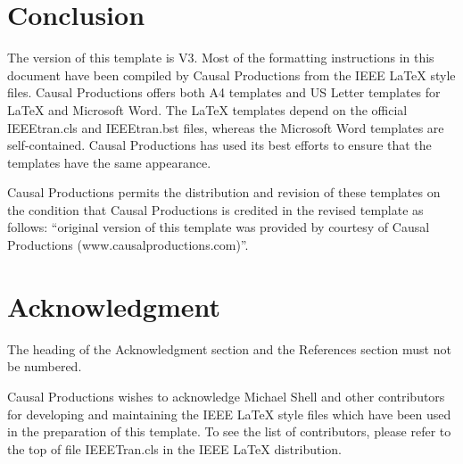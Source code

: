 \documentclass[10pt,conference,letterpaper]{IEEEtran}
\begin{document}
\enlargethispage{-62mm}

\section{Conclusion}

The version of this template is V3.  Most of the formatting
instructions in this document have been compiled by Causal Productions
from the IEEE LaTeX style files.  Causal Productions offers both A4
templates and US Letter templates for LaTeX and Microsoft Word.  The
LaTeX templates depend on the official IEEEtran.cls and IEEEtran.bst
files, whereas the Microsoft Word templates are self-contained.
Causal Productions has used its best efforts to ensure that the
templates have the same appearance.

Causal Productions permits the distribution and revision of these
templates on the condition that Causal Productions is credited in the
revised template as follows: ``original version of this template was
provided by courtesy of Causal Productions
(www.causalproductions.com)''.

\section*{Acknowledgment}

The heading of the Acknowledgment section and the References section
must not be numbered.

Causal Productions wishes to acknowledge Michael Shell and other
contributors for developing and maintaining the IEEE LaTeX style files
which have been used in the preparation of this template.  To see the
list of contributors, please refer to the top of file IEEETran.cls in
the IEEE LaTeX distribution.




\end{document}
